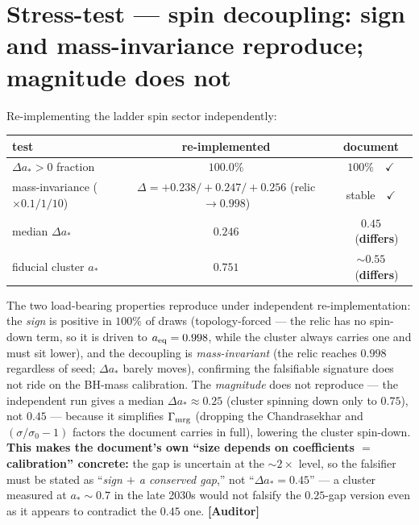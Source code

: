 \documentclass[11pt]{article}
\newcommand{\Auditor}{\textbf{\textcolor{teal!55!black}{[Auditor]}}}
\begin{document}
\section{Stress-test --- spin decoupling: sign and mass-invariance reproduce; magnitude does not}
Re-implementing the ladder spin sector independently:
\begin{center}\small
\begin{tabular}{@{}lcc@{}}
\toprule
test & re-implemented & document \\
\midrule
$\Delta a_\ast>0$ fraction & $100.0\%$ & $100\%$\ \ $\checkmark$ \\
mass-invariance ($\times0.1/1/10$) & $\Delta=+0.238/{+}0.247/{+}0.256$ (relic $\to0.998$) & stable\ \ $\checkmark$ \\
median $\Delta a_\ast$ & $0.246$ & $0.45$\ \ (\textbf{differs}) \\
fiducial cluster $a_\ast$ & $0.751$ & $\sim0.55$\ \ (\textbf{differs}) \\
\bottomrule
\end{tabular}
\end{center}
The two load-bearing properties reproduce under independent re-implementation: the \emph{sign} is positive in $100\%$ of draws (topology-forced --- the relic has no spin-down term, so it is driven to $a_{\rm eq}=0.998$, while the cluster always carries one and must sit lower), and the decoupling is \emph{mass-invariant} (the relic reaches $0.998$ regardless of seed; $\Delta a_\ast$ barely moves), confirming the falsifiable signature does not ride on the BH-mass calibration. The \emph{magnitude} does not reproduce --- the independent run gives a median $\Delta a_\ast\approx0.25$ (cluster spinning down only to $0.75$), not $0.45$ --- because it simplifies $\Gamma_{\rm mrg}$ (dropping the Chandrasekhar and $(\sigma/\sigma_0-1)$ factors the document carries in full), lowering the cluster spin-down. \textbf{This makes the document's own ``size depends on coefficients $=$ calibration'' concrete:} the gap is uncertain at the $\sim2\times$ level, so the falsifier must be stated as ``\emph{sign $+$ a conserved gap},'' not ``$\Delta a_\ast=0.45$'' --- a cluster measured at $a_\ast\sim0.7$ in the late 2030s would not falsify the $0.25$-gap version even as it appears to contradict the $0.45$ one. \Auditor
\end{document}

